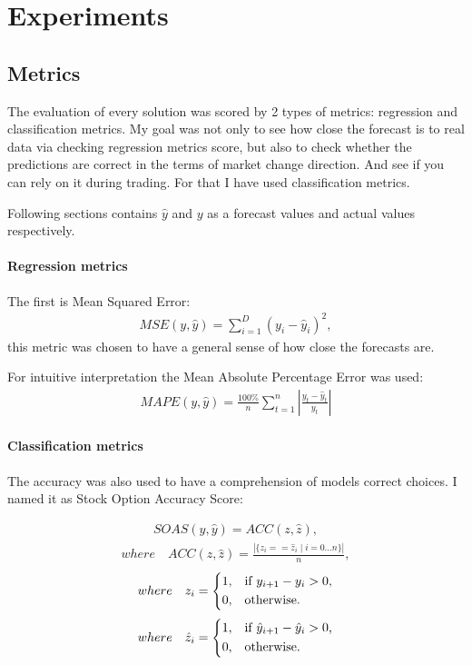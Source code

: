 \documentclass{article}
\begin{document}
\section{Experiments}
\label{sec:experiments}
\subsection{Metrics}
The evaluation of every solution was scored by 2 types of metrics: regression and classification metrics.
My goal was not only to see how close the forecast is to real data via checking regression metrics score, but also to check whether the predictions are correct in the terms of market change direction. And see if you can rely on it during trading.
For that I have used classification metrics.

Following sections contains $\hat{y}$ and $y$ as a forecast values and actual values respectively.

\paragraph{Regression metrics}

The first is Mean Squared Error:
\begin{align}
MSE(y, \hat{y})=\sum_{i=1}^{D}(y_i-\hat{y}_i)^2,
\end{align}
this metric was chosen to have a general sense of how close the forecasts are.

For intuitive interpretation the Mean Absolute Percentage Error was used:
\begin{align}
{MAPE(y, \hat{y})={\frac {100\%}{n}}\sum _{t=1}^{n}\left|{\frac {y_{t}-\hat{y}_{t}}{y_{t}}}\right|}
\end{align}
\paragraph{Classification metrics}

The accuracy was also used to have a comprehension of models correct choices. I named it as Stock Option Accuracy Score:

\begin{align}
SOAS(y, \hat{y}) = ACC(z, \hat{z}),
\end{align}
\begin{align}
where \quad ACC(z, \hat{z}) = \frac{\left|\{z_i == \hat{z}_i \mid i = 0...n\}\right|}{n}, \nonumber 
\end{align}
 \begin{align}
    where \quad z_{i} = \begin{dcases*}
        1, & if $ y_{i+1} - y_{i} > 0 $,\\
        0, & otherwise. 
        \end{dcases*} \nonumber 
  \end{align}
 \begin{align}
    where \quad \hat{z}_{i} = \begin{dcases*}
        1, & if $ \hat{y}_{i+1} - \hat{y}_{i} > 0 $,\\
        0, & otherwise. 
        \end{dcases*} \nonumber 
  \end{align}
\end{document}
